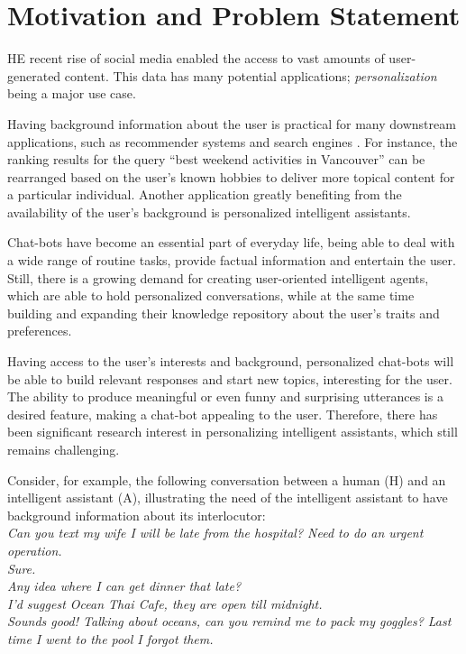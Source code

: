 \section{Motivation and Problem Statement}
\label{mot}

HE recent rise of social media enabled the access to vast amounts of user-generated content. This data has many potential applications; \textit{personalization} being a major use case.

Having background information about the user is practical for many downstream applications, such as recommender systems and search engines \cite{balog2019personal}. 
For instance, the ranking results for the query ``best weekend activities in Vancouver'' can be rearranged based on the user's known hobbies to deliver more topical content for a particular individual. Another application greatly benefiting from the availability of the user's background is personalized intelligent assistants.

Chat-bots have become an essential part of everyday life, being able to deal with a wide range of routine tasks, provide factual information and entertain the user. Still, there is a growing demand for creating user-oriented intelligent agents, which are able to hold personalized conversations, while at the same time building and expanding their knowledge repository about the user's traits and preferences. 

Having access to the user's interests and background, personalized chat-bots will be able to build relevant responses and start new topics, interesting for the user. The ability to produce meaningful or even funny and surprising utterances is a desired feature, making a chat-bot appealing to the user. Therefore, there has been significant research interest in personalizing intelligent assistants, which still remains challenging. 

Consider, for example, the following conversation between a human (H) and an intelligent assistant (A), illustrating the need of the intelligent assistant to have background information about its interlocutor:
\vspace{0.3cm} \\
\hspace*{0.3cm}{H:} {\em Can you text my wife I will be late from the hospital? Need to do an urgent operation.}\\
\hspace*{0.3cm}{A:} {\em Sure.}\\
\hspace*{0.3cm}{H:} {\em Any idea where I can get dinner that late?}\\
\hspace*{0.3cm}{A:} {\em I'd suggest Ocean Thai Cafe, they are open till midnight.}\\
\hspace*{0.3cm}{H:} {\em Sounds good! Talking about oceans, can you remind me to pack my goggles? Last time I went to the pool I forgot them.}
\vspace{0.3cm}

